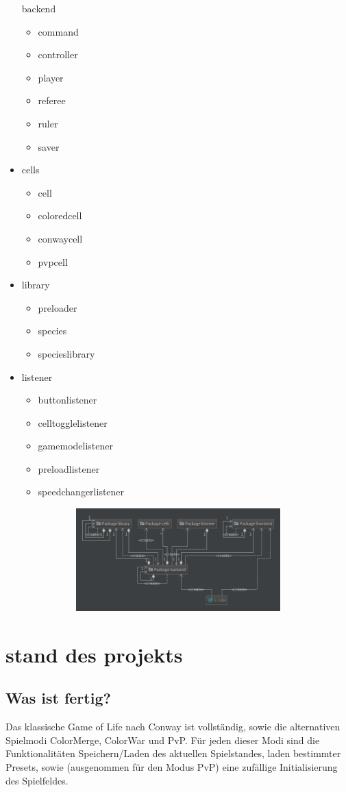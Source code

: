 \documentclass[12pt]{article}
\theoremstyle{plain}
\begin{document}
\begin{linenumbers}
\begin{itemize}
backend
\begin{itemize}
\item
command
\item
controller
\item
player
\item
referee
\item
ruler
\item
saver
\end{itemize}
\item
cells
\begin{itemize}
\item
cell
\item
coloredcell
\item
conwaycell
\item
pvpcell
\end{itemize}
\item
library
\begin{itemize}
\item
preloader
\item
species
\item
specieslibrary
\end{itemize}
\item
listener
\begin{itemize}
\item
buttonlistener
\item
celltogglelistener
\item
gamemodelistener
\item
preloadlistener
\item
speedchangerlistener
\end{itemize}
\end{itemize}

\includegraphics[width=1\textwidth, height=150px]{images/gogolPackages.png}
\newline

\section{stand des projekts}
\subsection{Was ist fertig?}
Das klassische Game of Life nach Conway ist vollständig, sowie die alternativen Spielmodi ColorMerge, ColorWar und PvP.
Für jeden dieser Modi sind die Funktionalitäten Speichern/Laden des aktuellen Spielstandes, laden bestimmter Presets, sowie (ausgenommen für den Modus PvP) eine zufällige Initialisierung des Spielfeldes.

\end{linenumbers}
\end{document}
